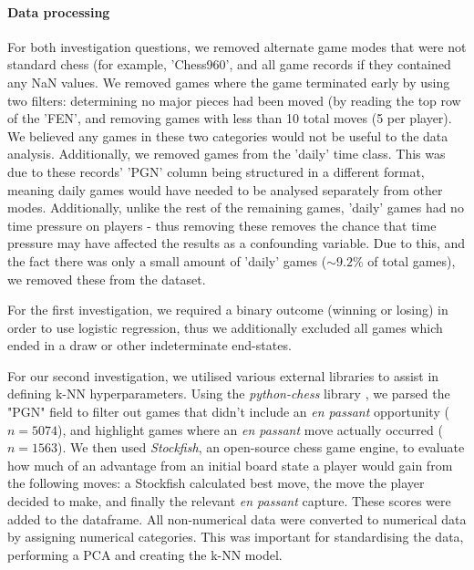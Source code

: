\documentclass[10pt,a4paper]{article}
\begin{document}
\begin{multicols}{2}
\paragraph{Data processing}
For both investigation questions, we removed alternate game modes that were not standard chess (for example, 'Chess960', and all game records if they contained any NaN values. We removed games where the game terminated early by using two filters: determining no major pieces had been moved (by reading the top row of the 'FEN', and removing games with less than 10 total moves (5 per player). We believed any games in these two categories would not be useful to the data analysis. Additionally, we removed games from the 'daily' time class. This was due to these records' 'PGN' column being structured in a different format, meaning daily games would have needed to be analysed separately from other modes. Additionally, unlike the rest of the remaining games, 'daily' games had no time pressure on players - thus removing these removes the chance that time pressure may have affected the results as a confounding variable. Due to this, and the fact there was only a small amount of 'daily' games ($\sim9.2\%$ of total games), we removed these from the dataset.\newline

For the first investigation, we required a binary outcome (winning or losing) in order to use logistic regression, thus we additionally excluded all games which ended in a draw or other indeterminate end-states. \newline

For our second investigation, we utilised various external libraries to assist in defining k-NN hyperparameters. Using the \textit{python-chess} library \cite{python-chess}, we parsed the "PGN" field to filter out games that didn't include an \textit{en passant} opportunity ($n=5074$), and highlight games where an \textit{en passant} move actually occurred ($n=1563$). We then used \textit{Stockfish}\cite{StockFish}, an open-source chess game engine, to evaluate how much of an advantage from an initial board state a player would gain from the following moves: a Stockfish calculated best move, the move the player decided to make, and finally the relevant \textit{en passant} capture. These scores were added to the dataframe. All non-numerical data were converted to numerical data by assigning numerical categories. This was important for standardising the data, performing a PCA and creating the k-NN model.\newline



\end{multicols}
\end{document}

